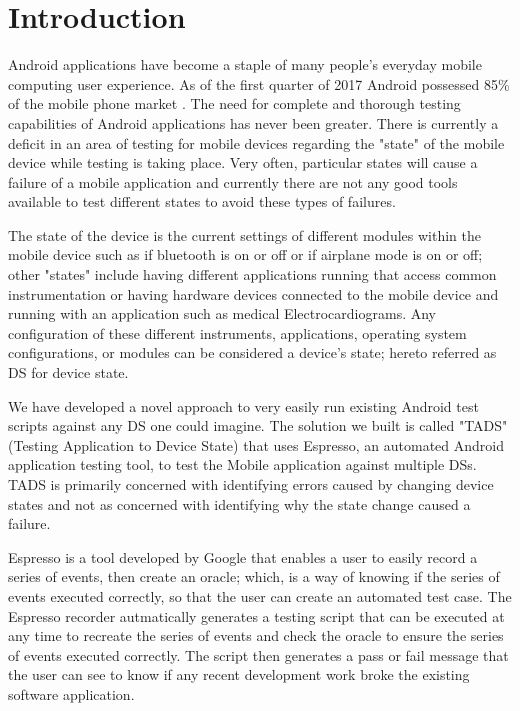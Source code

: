 \section{Introduction}
Android applications have become a staple of many people's everyday mobile computing user experience.  As of the first quarter of 2017 Android possessed 85\% of the mobile phone market \cite{chau_2017}.  The need for complete and thorough testing capabilities of Android applications has never been greater. There is currently a deficit in an area of testing for mobile devices regarding the "state" of the mobile device while testing is taking place. Very often, particular states will cause a failure of a mobile application and currently there are not any good tools available to test different states to avoid these types of failures.

The state of the device is the current settings of different modules within the mobile device such as if bluetooth is on or off or if airplane mode is on or off; other "states" include having different applications running that access common instrumentation or having hardware devices connected to the mobile device and running with an application such as medical Electrocardiograms.  Any configuration of these different instruments, applications, operating system configurations, or modules can be considered a device's state; hereto referred as DS for device state.

We have developed a novel approach to very easily run existing Android test scripts against any DS one could imagine.  The solution we built is called "TADS" (Testing Application to Device State) that uses Espresso, an automated Android application testing tool, to test the Mobile application against multiple DSs.  TADS is primarily concerned with identifying errors caused by changing device states and not as concerned with identifying why the state change caused a failure.

Espresso is a tool developed by Google that enables a user to easily record a series of events, then create an oracle; which, is a way of knowing if the series of events executed correctly, so that the user can create an automated test case.  The Espresso recorder autmatically generates a testing script that can be executed at any time to recreate the series of events and check the oracle to ensure the series of events executed correctly.  The script then generates a pass or fail message that the user can see to know if any recent development work broke the existing software application.

